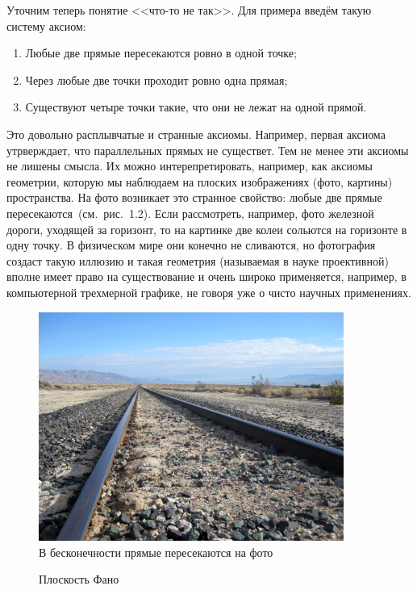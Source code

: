 Уточним теперь понятие <<что-то не так>>. Для примера введём такую систему аксиом:

\begin{enumerate}
\item Любые две прямые пересекаются ровно в одной точке;
\item Через любые две точки проходит ровно одна прямая;
\item Существуют четыре точки такие, что они не лежат на одной прямой.
\end{enumerate}

Это довольно расплывчатые и странные аксиомы. Например, первая аксиома утрверждает, что параллельных прямых не существет. Тем не менее эти аксиомы не лишены смысла. Их можно интерепретировать, например, как аксиомы геометрии, которую мы наблюдаем на плоских изображениях (фото, картины) пространства. На фото возникает это странное свойство: любые две прямые пересекаются~(см.~рис.~1.2). Если рассмотреть, например, фото железной дороги, уходящей за горизонт, то на картинке две колеи сольются на горизонте в одну точку. В физическом мире они конечно не сливаются, но фотография создаст такую иллюзию и такая геометрия (называемая в науке проективной) вполне имеет право на существование и очень широко применяется, например, в компьютерной трехмерной графике, не говоря уже о чисто научных применениях.

\begin{figure}[h]
\centering
\includegraphics[width=10cm]{images/parallels.png}
\caption{В бесконечности прямые пересекаются на фото}
\end{figure}

\begin{figure}[h]
\centering
{}
\caption{Плоскость Фано}
\end{figure}

